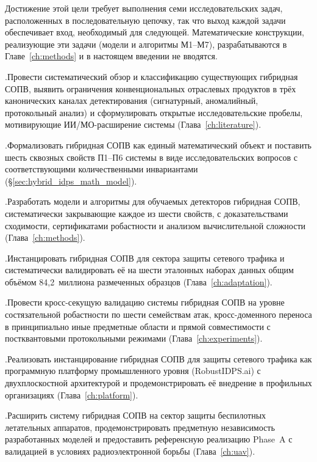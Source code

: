 Достижение этой цели требует выполнения семи исследовательских
задач, расположенных в последовательную цепочку, так что выход
каждой задачи обеспечивает вход, необходимый для следующей.
Математические конструкции, реализующие эти задачи (модели и
алгоритмы М1--М7), разрабатываются в Главе~\ref{ch:methods} и в
настоящем введении не вводятся.

.\quad Провести систематический обзор и классификацию
существующих гибридная СОПВ, выявить ограничения конвенциональных
отраслевых продуктов в трёх канонических каналах детектирования
(сигнатурный, аномалийный, протокольный анализ) и сформулировать
открытые исследовательские пробелы, мотивирующие
ИИ/МО-расширение системы (Глава~\ref{ch:literature}).

.\quad Формализовать гибридная СОПВ как единый
математический объект и поставить шесть сквозных свойств П1--П6
системы в виде исследовательских вопросов с соответствующими
количественными инвариантами
(\S\ref{sec:hybrid_idps_math_model}).

.\quad Разработать модели и алгоритмы для обучаемых
детекторов гибридная СОПВ, систематически закрывающие каждое из
шести свойств, с доказательствами сходимости, сертификатами
робастности и анализом вычислительной сложности
(Глава~\ref{ch:methods}).

.\quad Инстанцировать гибридная СОПВ для сектора защиты
сетевого трафика и систематически валидировать её на шести
эталонных наборах данных общим объёмом 84{,}2~миллиона
размеченных образцов (Глава~\ref{ch:adaptation}).

.\quad Провести кросс-секущую валидацию системы
гибридная СОПВ на уровне состязательной робастности по шести
семействам атак, кросс-доменного переноса в принципиально иные
предметные области и прямой совместимости с постквантовыми
протокольными режимами (Глава~\ref{ch:experiments}).

.\quad Реализовать инстанцирование гибридная СОПВ для
защиты сетевого трафика как программную платформу промышленного
уровня (\textsf{RobustIDPS.ai}) с двухплоскостной архитектурой и
продемонстрировать её внедрение в профильных организациях
(Глава~\ref{ch:platform}).

.\quad Расширить систему гибридная СОПВ на сектор защиты
беспилотных летательных аппаратов, продемонстрировать предметную
независимость разработанных моделей и предоставить референсную
реализацию Phase~A с валидацией в условиях радиоэлектронной
борьбы (Глава~\ref{ch:uav}).

